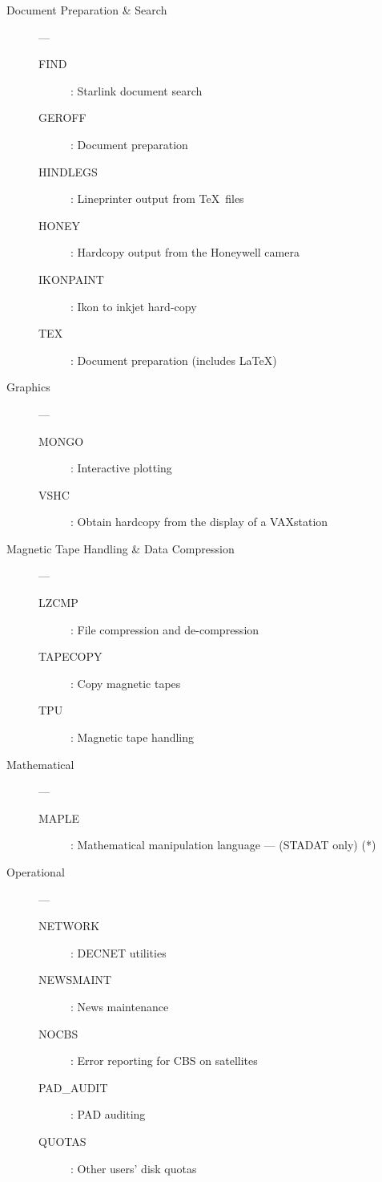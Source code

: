 \begin{description}

\item [Document Preparation \& Search] ---
\begin{description}
\item [FIND] : Starlink document search
\item [GEROFF] : Document preparation
\item [HINDLEGS] : Lineprinter output from \TeX\ files
\item [HONEY] : Hardcopy output from the Honeywell camera
\item [IKONPAINT] : Ikon to inkjet hard-copy
\item [TEX] : Document preparation (includes \LaTeX)
\end{description}

\item [Graphics] ---
\begin{description}
\item [MONGO] : Interactive plotting
\item [VSHC] : Obtain hardcopy from the display of a VAXstation
\end{description}

\item [Magnetic Tape Handling \& Data Compression] ---
\begin{description}
\item [LZCMP] : File compression and de-compression
\item [TAPECOPY] : Copy magnetic tapes
\item [TPU] : Magnetic tape handling
\end{description}

\item [Mathematical] ---
\begin{description}
\item [MAPLE] : Mathematical manipulation language --- (STADAT only) (*)
\end{description}

\item [Operational] ---
\begin{description}
\item [NETWORK] : DECNET utilities
\item [NEWSMAINT] : News maintenance
\item [NOCBS] : Error reporting for CBS on satellites
\item [PAD\_AUDIT] : PAD auditing
\item [QUOTAS] : Other users' disk quotas
\end{description}


\end{description}
